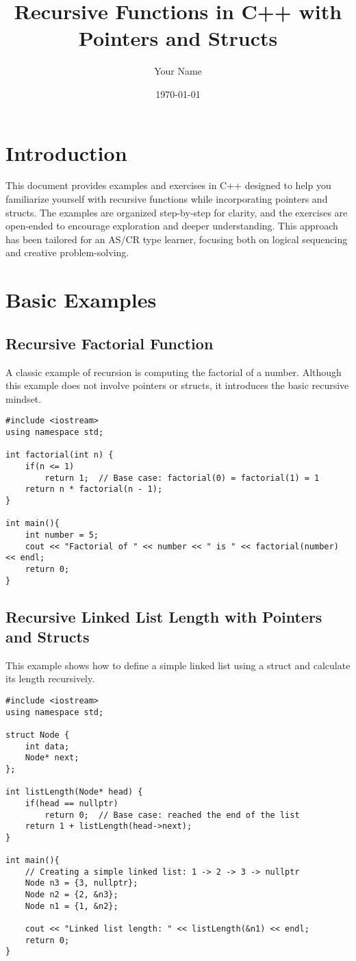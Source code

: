\documentclass{article}
\title{Recursive Functions in C++ with Pointers and Structs}
\author{Your Name}
\date{\today}
\begin{document}
\maketitle

\section{Introduction}
This document provides examples and exercises in C++ designed to help you familiarize yourself with recursive functions while incorporating pointers and structs. The examples are organized step-by-step for clarity, and the exercises are open-ended to encourage exploration and deeper understanding. This approach has been tailored for an AS/CR type learner, focusing both on logical sequencing and creative problem-solving.

\section{Basic Examples}

\subsection{Recursive Factorial Function}
A classic example of recursion is computing the factorial of a number. Although this example does not involve pointers or structs, it introduces the basic recursive mindset.

\begin{lstlisting}
#include <iostream>
using namespace std;

int factorial(int n) {
    if(n <= 1)
        return 1;  // Base case: factorial(0) = factorial(1) = 1
    return n * factorial(n - 1);
}

int main(){
    int number = 5;
    cout << "Factorial of " << number << " is " << factorial(number) << endl;
    return 0;
}
\end{lstlisting}

\subsection{Recursive Linked List Length with Pointers and Structs}
This example shows how to define a simple linked list using a struct and calculate its length recursively.

\begin{lstlisting}
#include <iostream>
using namespace std;

struct Node {
    int data;
    Node* next;
};

int listLength(Node* head) {
    if(head == nullptr)
        return 0;  // Base case: reached the end of the list
    return 1 + listLength(head->next);
}

int main(){
    // Creating a simple linked list: 1 -> 2 -> 3 -> nullptr
    Node n3 = {3, nullptr};
    Node n2 = {2, &n3};
    Node n1 = {1, &n2};

    cout << "Linked list length: " << listLength(&n1) << endl;
    return 0;
}
\end{lstlisting}
\end{document}
